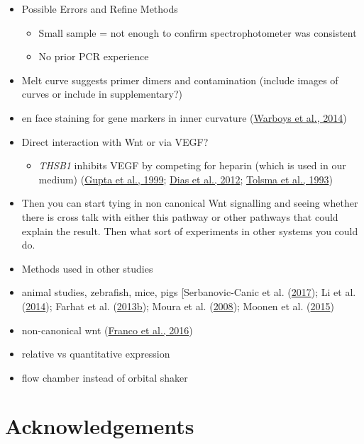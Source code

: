 \documentclass[
  11pt,
]{article}
\providecommand{\tightlist}{%
  \setlength{\itemsep}{0pt}\setlength{\parskip}{0pt}}
\begin{document}
\begin{itemize}
\item
  Possible Errors and Refine Methods

  \begin{itemize}
  \item
    Small sample = not enough to confirm spectrophotometer was consistent
  \item
    No prior PCR experience
  \end{itemize}
\item
  Melt curve suggests primer dimers and contamination (include images of curves or include in supplementary?)
\item
  en face staining for gene markers in inner curvature (\protect\hyperlink{ref-Warboys2014}{Warboys et al., 2014})
\item
  Direct interaction with Wnt or via VEGF?

  \begin{itemize}
  \tightlist
  \item
    \emph{THSB1} inhibits VEGF by competing for heparin (which is used in our medium) (\protect\hyperlink{ref-gupta1999}{Gupta et al., 1999}; \protect\hyperlink{ref-dias2012}{Dias et al., 2012}; \protect\hyperlink{ref-tolsma1993}{Tolsma et al., 1993})
  \end{itemize}
\item
  Then you can start tying in non canonical Wnt signalling and seeing whether there is cross talk with either this pathway or other pathways that could explain the result.
  Then what sort of experiments in other systems you could do.
\item
  Methods used in other studies
\item
  animal studies, zebrafish, mice, pigs {[}Serbanovic-Canic et al. (\protect\hyperlink{ref-serbanovic-canic2017}{2017}); Li et al. (\protect\hyperlink{ref-Li2014-mx}{2014}); Farhat et al. (\protect\hyperlink{ref-farhat2013a}{2013b}); Moura et al. (\protect\hyperlink{ref-Moura2008}{2008}); Moonen et al. (\protect\hyperlink{ref-moonen2015}{2015})
\item
  non-canonical wnt (\protect\hyperlink{ref-franco2016}{Franco et al., 2016})
\item
  relative vs quantitative expression
\item
  flow chamber instead of orbital shaker
\end{itemize}

\color{black}

\hypertarget{acknowledgements}{%
\section{Acknowledgements}\label{acknowledgements}}
\end{document}
